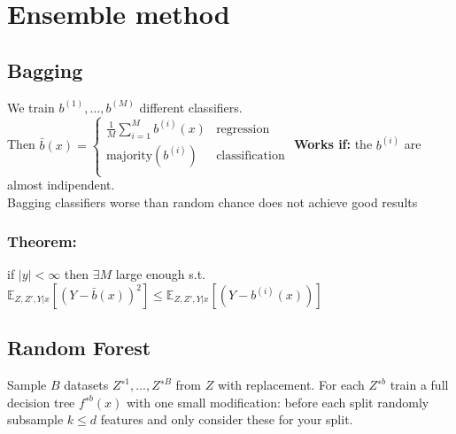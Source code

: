 \section{Ensemble method}

\subsection*{Bagging}
We train $b^{(1)}, \dots, b^{(M)}$ different classifiers. \\
Then \(\bar{b}(x)=
\begin{cases}
	\frac{1}{M}\sum_{i = 1}^M b^{(i)}(x) & \text{regression}\\
	\text{majority}\left(b^{(i)}\right)  & \text{classification}\\
\end{cases}\)
\textbf{Works if:} the $b^{(i)}$ are almost indipendent.\\
Bagging classifiers worse than random chance does not achieve good results
\subsubsection{Theorem:}
if $|y|<\infty$ then $\exists M$ large enough s.t.\\
$\mathbb{E}_{Z,Z',Y|x}\left[(Y-\bar{b}(x))^2\right]\leq \mathbb{E}_{Z,Z',Y|x}\left[(Y-b^{(i)}(x))\right]$

\subsection*{Random Forest}
Sample $B$ datasets $Z^{∗1},...,Z^{∗B}$ from $Z$ with replacement.
For each $Z^{∗b}$ train a full decision tree $f^{∗b}(x)$ with one small modification:  before each split randomly subsample $k \leq d$ features and only consider these for your split.

